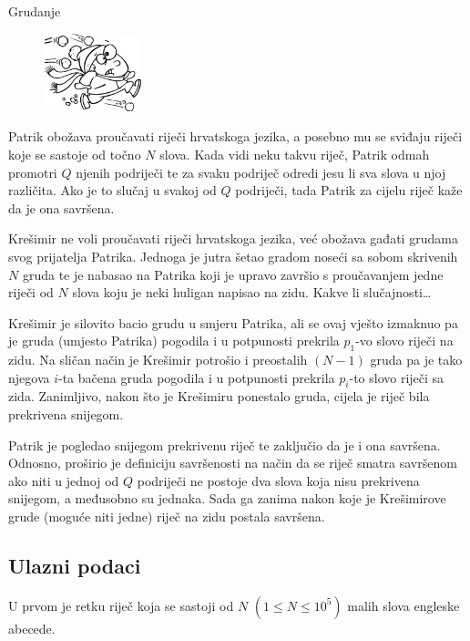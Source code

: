 \begin{statement}[
  problempoints=70,
  timelimit=2 sekunde,
  memorylimit=512 MiB,
]{Grudanje}

\setlength\intextsep{-0.1cm}
\begin{figure}
\centering
\includegraphics[width=0.25\textwidth]{img/gruda.png}
\end{figure}

Patrik obožava proučavati riječi hrvatskoga jezika, a posebno mu se sviđaju
riječi koje se sastoje od točno $N$ slova. Kada vidi neku takvu riječ, Patrik
odmah promotri $Q$ njenih podriječi te za svaku podriječ odredi jesu li sva
slova u njoj različita. Ako je to slučaj u svakoj od $Q$ podriječi, tada Patrik
za cijelu riječ kaže da je ona savršena.

Krešimir ne voli proučavati riječi hrvatskoga jezika, već obožava gađati
grudama svog prijatelja Patrika. Jednoga je jutra šetao gradom noseći sa
sobom skrivenih $N$ gruda te je nabasao na Patrika koji je upravo završio s
proučavanjem jedne riječi od $N$ slova koju je neki huligan napisao na zidu.
Kakve li slučajnosti\dots

Krešimir je silovito bacio grudu u smjeru Patrika, ali se ovaj vješto
izmaknuo pa je gruda (umjesto Patrika) pogodila i u potpunosti prekrila $p_1$-vo
slovo riječi na zidu. Na sličan način je Krešimir potrošio i preostalih $(N-1)$
gruda pa je tako njegova $i$-ta bačena gruda pogodila i u potpunosti prekrila
$p_i$-to slovo riječi sa zida. Zanimljivo, nakon što je Krešimiru ponestalo
gruda, cijela je riječ bila prekrivena snijegom.

Patrik je pogledao snijegom prekrivenu riječ te zaključio da je i ona savršena.
Odnosno, proširio je definiciju savršenosti na način da se riječ smatra
savršenom ako niti u jednoj od $Q$ podriječi ne postoje dva slova koja nisu
prekrivena snijegom, a međusobno su jednaka. Sada ga zanima nakon koje je
Krešimirove grude (moguće niti jedne) riječ na zidu postala savršena.

\subsection*{Ulazni podaci}
U prvom je retku riječ koja se sastoji od $N$ $(1 \le N \le 10^5)$ malih slova
engleske abecede.


\end{statement}
